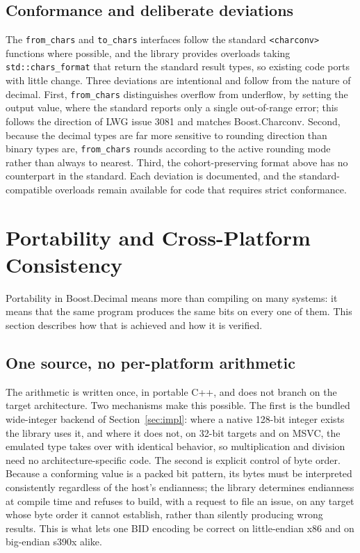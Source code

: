 \documentclass[acmsmall]{acmart}
\begin{document}
\subsection{Conformance and deliberate deviations}
The \texttt{from\_chars} and \texttt{to\_chars} interfaces follow the standard
\texttt{<charconv>} functions where possible, and the library provides overloads taking
\texttt{std::chars\_format} that return the standard result types, so existing code ports
with little change. Three deviations are intentional and follow from the nature of
decimal. First, \texttt{from\_chars} distinguishes overflow from underflow, by setting
the output value, where the standard reports only a single out-of-range error; this
follows the direction of LWG issue 3081 and matches Boost.Charconv. Second, because the
decimal types are far more sensitive to rounding direction than binary types are,
\texttt{from\_chars} rounds according to the active rounding mode rather than always to
nearest. Third, the cohort-preserving format above has no counterpart in the standard.
Each deviation is documented, and the standard-compatible overloads remain available for
code that requires strict conformance.

\section{Portability and Cross-Platform Consistency}
\label{sec:portability}

Portability in Boost.Decimal means more than compiling on many systems: it means that
the same program produces the same bits on every one of them. This section describes how
that is achieved and how it is verified.

\subsection{One source, no per-platform arithmetic}
The arithmetic is written once, in portable C++, and does not branch on the target
architecture. Two mechanisms make this possible. The first is the bundled wide-integer
backend of Section~\ref{sec:impl}: where a native 128-bit integer exists the library uses
it, and where it does not, on 32-bit targets and on MSVC, the emulated type takes over
with identical behavior, so multiplication and division need no architecture-specific
code. The second is explicit control of byte order. Because a conforming value is a
packed bit pattern, its bytes must be interpreted consistently regardless of the host's
endianness; the library determines endianness at compile time and refuses to build, with
a request to file an issue, on any target whose byte order it cannot establish, rather
than silently producing wrong results. This is what lets one BID encoding be correct on
little-endian x86 and on big-endian s390x alike.
\end{document}
